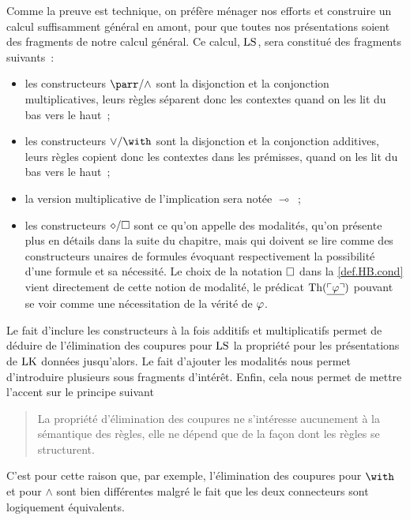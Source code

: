 Comme la preuve est technique, on préfère ménager nos efforts et construire un
calcul suffisamment général en amont, pour que toutes nos présentations soient
des fragments de notre calcul général. Ce calcul, $\operatorname{LS}$, sera constitué des
fragments suivants~:
\begin{itemize}
\item les constructeurs $\parr/\land$ sont la disjonction et la conjonction
  multiplicatives, leurs règles séparent donc les contextes quand on les
  lit du bas vers le haut~;
\item les constructeurs $\lor/\with$ sont la disjonction et la conjonction
  additives, leurs règles copient donc les contextes dans les prémisses,
  quand on les lit du bas vers le haut~;
\item la version multiplicative de l'implication sera notée $\multimap$~;
\item les constructeurs $\mathbin{\diamond}/\mathbin{\square}$ sont ce qu'on appelle des modalités,
  qu'on présente plus en détails dans la suite du chapitre, mais qui doivent
  se lire comme des constructeurs unaires de formules évoquant respectivement
  la possibilité d'une formule et sa nécessité. Le choix de la notation
  $\mathbin{\square}$ dans la \cref{def.HB.cond} vient directement de cette notion de
  modalité, le prédicat $\operatorname{Th}(\underline{\ulcorner\varphi\urcorner})$ pouvant se voir
  comme une nécessitation de la vérité de $\varphi$.
\end{itemize}
Le fait d'inclure les constructeurs à la fois additifs et multiplicatifs permet
de déduire de l'élimination des coupures pour $\operatorname{LS}$ la propriété pour les
présentations de $\operatorname{LK}$ données jusqu'alors. Le fait d'ajouter les modalités
nous permet d'introduire plusieurs sous fragments d'intérêt. Enfin, cela nous
permet de mettre l'accent sur le principe suivant
\begin{quotation}
  \noindent
  La propriété d'élimination des coupures ne s'intéresse aucunement à la
  sémantique des règles, elle ne dépend que de la façon dont les règles se
  structurent.
\end{quotation}
C'est pour cette raison que, par exemple, l'élimination des coupures pour
$\with$ et pour $\land$ sont bien différentes malgré le fait que les deux
connecteurs sont logiquement équivalents.

